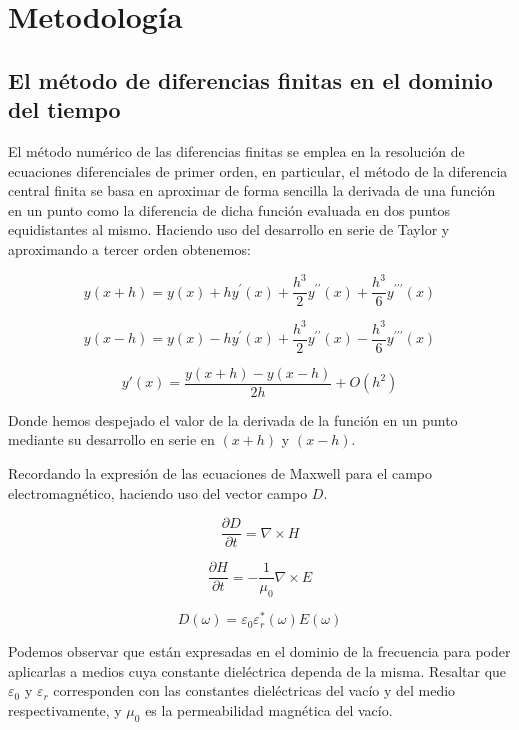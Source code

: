 \documentclass[11pt,a4paper,twoside,pdf]{article}
\numberwithin{equation}{section}
\begin{document}
\section{Metodología}
\subsection{El método de diferencias finitas en el dominio del tiempo} \label{section:metodo_diferencias_finitas}
El método numérico de las diferencias finitas se emplea en la resolución de ecuaciones diferenciales de primer orden, en particular, el método de la diferencia central finita se basa en aproximar de forma sencilla la derivada de una función en un punto como la diferencia de dicha función evaluada en dos puntos equidistantes al mismo. Haciendo uso del desarrollo en serie de Taylor y aproximando a tercer orden obtenemos:

\begin{equation}
y(x+h)=y(x)+hy^\prime(x)+\frac{h^3}{2}y^{\prime\prime}(x)+\frac{h^3}{6}y^{\prime\prime\prime}(x)
\end{equation}

\begin{equation}
y(x-h)=y(x)-hy^\prime(x)+\frac{h^3}{2}y^{\prime\prime}(x)-\frac{h^3}{6}y^{\prime\prime\prime}(x)
\end{equation}

\begin{equation}
y\prime(x)=\frac{y(x+h)-y(x-h)}{2h}+O(h^2)
\end{equation}

Donde hemos despejado el valor de la derivada de la función en un punto mediante su desarrollo en serie en $(x+h)$ y $(x-h)$.

Recordando la expresión de las ecuaciones de Maxwell para el campo electromagnético, haciendo uso del vector campo $D$.

\begin{equation}
\frac{\partial D}{\partial t}=\nabla \times H
\end{equation}

\begin{equation}
\frac{\partial H}{\partial t}=-\frac{1}{\mu_{0}}\nabla \times E
\end{equation}

\begin{equation}
D(\omega)=\varepsilon_{0}\varepsilon^*_{r}(\omega)E(\omega)
\end{equation}

Podemos observar que están expresadas en el dominio de la frecuencia para poder aplicarlas a medios cuya constante dieléctrica dependa de la misma. Resaltar que $\varepsilon_{0}$ y $\varepsilon_{r}$ corresponden con las constantes dieléctricas del vacío y del medio respectivamente, y $\mu_{0}$ es la permeabilidad magnética del vacío.
\end{document}
